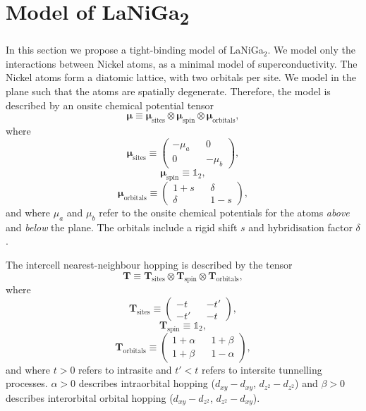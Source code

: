 \chapter{\label{ch:laniga}Model of LaNiGa\textsubscript{2}}
\graphicspath{{../gfx/chapter03/}{../plots/chapter03/}}


In this section we propose a tight-binding model of LaNiGa$_2$. We model only the interactions between Nickel atoms, as a minimal model of superconductivity. The Nickel atoms form a diatomic lattice, with two orbitals per site. We model in the plane such that the atoms are spatially degenerate. Therefore, the model is described by an onsite chemical potential tensor
\begin{equation}
\bm{\mu}\equiv\bm{\mu}_\text{sites}\otimes\bm{\mu}_\text{spin}\otimes\bm{\mu}_\text{orbitals},
\end{equation}
where
\begin{equation}
\bm{\mu}_\text{sites}\equiv
\begin{pmatrix}
-\mu_a && 0 \\ 0 && -\mu_b
\end{pmatrix},
\end{equation}
\begin{equation}
\bm{\mu}_\text{spin}\equiv\mathbb{1}_2,
\end{equation}
\begin{equation}
\bm{\mu}_\text{orbitals}\equiv
\begin{pmatrix}
1+s && \delta \\ \delta && 1-s
\end{pmatrix},
\end{equation}
and where $\mu_a$ and $\mu_b$ refer to the onsite chemical potentials for the atoms \textit{above} and \textit{below} the plane. The orbitals include a rigid shift $s$ and hybridisation factor $\delta$.

The intercell nearest-neighbour hopping is described by the tensor
\begin{equation}
\bm{T}\equiv\bm{T}_\text{sites}\otimes\bm{T}_\text{spin}\otimes\bm{T}_\text{orbitals},
\end{equation}
where
\begin{equation}
\bm{T}_\text{sites}\equiv
\begin{pmatrix}
-t && -t' \\ -t' && -t
\end{pmatrix},
\end{equation}
\begin{equation}
\bm{T}_\text{spin}\equiv\mathbb{1}_2,
\end{equation}
\begin{equation}
\bm{T}_\text{orbitals}\equiv
\begin{pmatrix}
1+\alpha && 1+\beta \\ 1+\beta && 1-\alpha
\end{pmatrix},
\end{equation}
and where $t>0$ refers to intrasite and $t'<t$ refers to intersite tunnelling processes. $\alpha>0$ describes intraorbital hopping ($d_{xy}-d_{xy}$, $d_{z^2}-d_{z^2}$) and $\beta>0$ describes interorbital orbital hopping ($d_{xy}-d_{z^2}$, $d_{z^2}-d_{xy}$).

